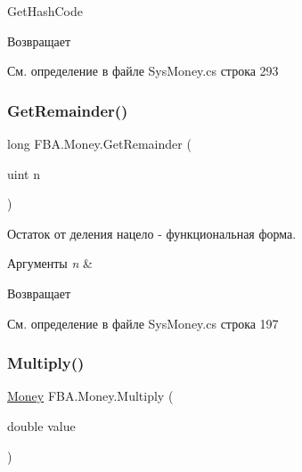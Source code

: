 Get\+Hash\+Code 

\begin{DoxyReturn}{Возвращает}

\end{DoxyReturn}


См. определение в файле Sys\+Money.\+cs строка 293

\mbox{\label{struct_f_b_a_1_1_money_a985f9e6a97bd918c16d9cb5275122755}} 
\subsubsection{\texorpdfstring{Get\+Remainder()}{GetRemainder()}}
{\footnotesize\ttfamily long F\+B\+A.\+Money.\+Get\+Remainder (\begin{DoxyParamCaption}\item[{uint}]{n }\end{DoxyParamCaption})}



Остаток от деления нацело -\/ функциональная форма. 


\begin{DoxyParams}{Аргументы}
{\em n} & \\
\hline
\end{DoxyParams}
\begin{DoxyReturn}{Возвращает}

\end{DoxyReturn}


См. определение в файле Sys\+Money.\+cs строка 197

\mbox{\label{struct_f_b_a_1_1_money_afc1d36bb92c528e150548fe745650c95}} 
\subsubsection{\texorpdfstring{Multiply()}{Multiply()}}
{\footnotesize\ttfamily \mbox{\hyperlink{struct_f_b_a_1_1_money}{Money}} F\+B\+A.\+Money.\+Multiply (\begin{DoxyParamCaption}\item[{double}]{value }\end{DoxyParamCaption})}



